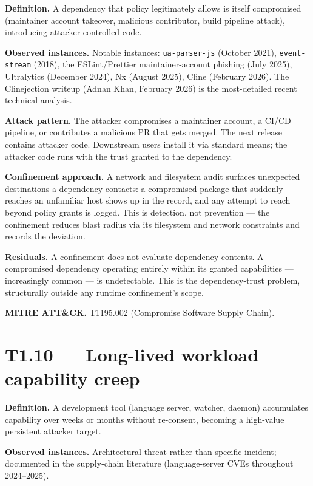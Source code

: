 \textbf{Definition.} A dependency that policy legitimately allows is
itself compromised (maintainer account takeover, malicious contributor,
build pipeline attack), introducing attacker-controlled code.

\textbf{Observed instances.} Notable instances: \texttt{ua-parser-js}
(October 2021), \texttt{event-stream} (2018), the ESLint/Prettier
maintainer-account phishing (July 2025), Ultralytics (December 2024), Nx
(August 2025), Cline (February 2026). The Clinejection writeup (Adnan
Khan, February 2026) is the most-detailed recent technical analysis.

\textbf{Attack pattern.} The attacker compromises a maintainer account,
a CI/CD pipeline, or contributes a malicious PR that gets merged. The
next release contains attacker code. Downstream users install it via
standard means; the attacker code runs with the trust granted to the
dependency.

\textbf{Confinement approach.} A network and filesystem audit surfaces
unexpected destinations a dependency contacts: a compromised package
that suddenly reaches an unfamiliar host shows up in the record, and any
attempt to reach beyond policy grants is logged. This is detection, not
prevention --- the confinement reduces blast radius via its filesystem
and network constraints and records the deviation.

\textbf{Residuals.} A confinement does not evaluate dependency contents.
A compromised dependency operating entirely within its granted
capabilities --- increasingly common --- is undetectable. This is the
dependency-trust problem, structurally outside any runtime confinement's
scope.

\textbf{MITRE ATT\&CK.} T1195.002 (Compromise Software Supply Chain).

\hypertarget{t1.10-long-lived-workload-capability-creep}{%
\section{T1.10 --- Long-lived workload capability
creep}\label{t1.10-long-lived-workload-capability-creep}}

\textbf{Definition.} A development tool (language server, watcher,
daemon) accumulates capability over weeks or months without re-consent,
becoming a high-value persistent attacker target.

\textbf{Observed instances.} Architectural threat rather than specific
incident; documented in the supply-chain literature (language-server
CVEs throughout 2024--2025).

